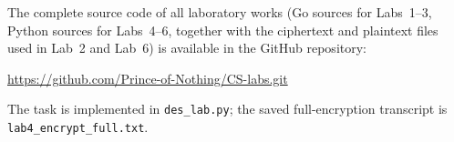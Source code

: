 \documentclass[12pt,a4paper]{article}
\begin{document}
The complete source code of all laboratory works (Go sources for Labs~1--3, Python sources for Labs~4--6, together with the ciphertext and plaintext files used in Lab~2 and Lab~6) is available in the GitHub repository:

\begin{center}
  \url{https://github.com/Prince-of-Nothing/CS-labs.git}
\end{center}

{\raggedright
The task is implemented in \texttt{des\_lab.py}; the saved full-encryption transcript is \texttt{lab4\_encrypt\_full.txt}.\par}
\end{document}
